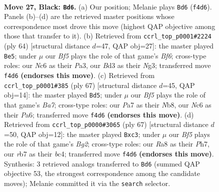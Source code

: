 \documentclass[11pt]{article}
\begin{document}
\clearpage

\begin{figure}[p]\centering
\begin{subfigure}{0.46\textwidth}\centering
\resizebox{\linewidth}{!}{%
\newchessgame
\chessboard[
  setfen={r3k3/pR6/2n3p1/6P1/5b2/3b4/3B4/4K1N1 b q - 0 27},
  showmover=false,
  pgfstyle=straightmove, color=movearrow, markmove={f4-d6}
]}
\caption{}
\end{subfigure}\hfill
\begin{subfigure}{0.46\textwidth}\centering
\resizebox{\linewidth}{!}{%
\newchessgame
\chessboard[
  setfen={4k3/1b6/p4B2/1p1n4/7P/P2P2N1/7r/1K4R1 w - - 4 33},
  showmover=false,
  pgfstyle=straightmove, color=movearrow, markmove={f6-e5}
]}
\caption{}
\end{subfigure}
\\[4pt]
\begin{subfigure}{0.46\textwidth}\centering
\resizebox{\linewidth}{!}{%
\newchessgame
\chessboard[
  setfen={1n4k1/2b5/p7/2N5/8/P7/bR1K2PP/8 b - - 3 34},
  showmover=false,
  pgfstyle=straightmove, color=movearrow, markmove={a2-d5}
]}
\caption{}
\end{subfigure}\hfill
\begin{subfigure}{0.46\textwidth}\centering
\resizebox{\linewidth}{!}{%
\newchessgame
\chessboard[
  setfen={5k2/6bp/3p4/8/2B2P2/2N2K2/3r3P/5R2 b - - 0 34},
  showmover=false,
  pgfstyle=straightmove, color=movearrow, markmove={g7-c3}
]}
\caption{}
\end{subfigure}
\caption{\textbf{Move 27, Black: \texttt{Bd6}.} (a) Our position; Melanie plays \texttt{Bd6} (\texttt{f4d6}). Panels (b)--(d) are the retrieved master positions whose correspondence most drove this move (highest QAP objective among those that transfer to it). (b) Retrieved from \texttt{ccrl\_top\_p0001\#2224} (ply 64) [structural distance $d$=47, QAP obj=27]: the master played \texttt{Be5}; under $\mu$ our \emph{Bf5} plays the role of that game's \emph{Bf6}; cross-type roles: our \emph{N}c6 as their \emph{P}a3, our \emph{B}d3 as their \emph{N}g3; transferred move \texttt{f4d6} \textbf{(endorses this move)}. (c) Retrieved from \texttt{ccrl\_top\_p0001\#385} (ply 67) [structural distance $d$=45, QAP obj=14]: the master played \texttt{Bd5}; under $\mu$ our \emph{Bf5} plays the role of that game's \emph{Ba7}; cross-type roles: our \emph{P}a7 as their \emph{N}b8, our \emph{N}c6 as their \emph{P}a6; transferred move \texttt{f4d6} \textbf{(endorses this move)}. (d) Retrieved from \texttt{ccrl\_top\_p0000\#3065} (ply 67) [structural distance $d$=50, QAP obj=12]: the master played \texttt{Bxc3}; under $\mu$ our \emph{Bf5} plays the role of that game's \emph{Bg2}; cross-type roles: our \emph{R}a8 as their \emph{P}h7, our \emph{r}b7 as their \emph{b}c4; transferred move \texttt{f4d6} \textbf{(endorses this move)}. Synthesis: 3 retrieved analogs transferred to \texttt{Bd6} (summed QAP objective 53, the strongest correspondence among the candidate moves); Melanie committed it via the \texttt{search} selector.}
\label{fig:thought-m53}
\end{figure}
\end{document}
